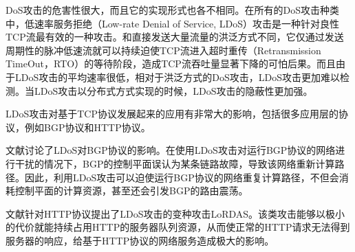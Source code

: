 DoS攻击的危害性很大，而且它的实现形式也各不相同。在所有的DoS攻击种类中，低速率服务拒绝（Low-rate Denial of Service, LDoS）攻击\cite{LDoS}是一种针对良性TCP流最有效的一种攻击。和直接发送大量流量的洪泛方式不同，它仅通过发送周期性的脉冲低速流就可以持续迫使TCP流进入超时重传（Retransmission TimeOut，RTO）的等待阶段，造成TCP流吞吐量显著下降的可怕后果。而且由于LDoS攻击的平均速率很低，相对于洪泛方式的DoS攻击，LDoS攻击更加难以检测。当LDoS攻击以分布式方式实现的时候，LDoS攻击的隐蔽性更加强。

LDoS攻击对基于TCP协议发展起来的应用有非常大的影响，包括很多应用层的协议，例如BGP协议和HTTP协议。

文献讨论了LDoS对BGP协议的影响。在使用LDoS攻击对运行BGP协议的网络进行干扰的情况下，BGP的控制平面误认为某条链路故障，导致该网络重新计算路径。因此，利用LDoS攻击可以迫使运行BGP协议的网络重复计算路径，不但会消耗控制平面的计算资源，甚至还会引发BGP的路由震荡。

文献针对HTTP协议提出了LDoS攻击的变种攻击LoRDAS。该类攻击能够以极小的代价就能持续占用HTTP的服务器队列资源，从而使正常的HTTP请求无法得到服务器的响应，给基于HTTP协议的网络服务造成极大的影响。



